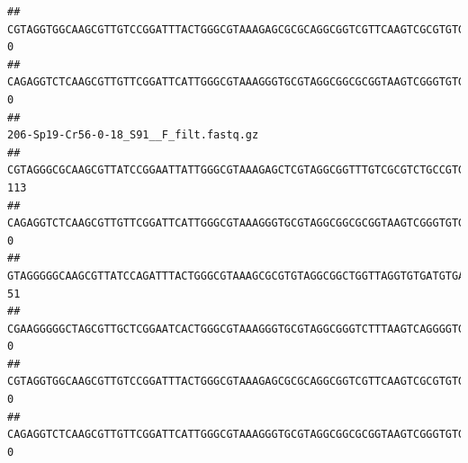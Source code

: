 \documentclass[]{article}
\begin{document}
\begin{verbatim}
## CGTAGGTGGCAAGCGTTGTCCGGATTTACTGGGCGTAAAGAGCGCGCAGGCGGTCGTTCAAGTCGCGTGTGAAAGCCCCCGGCTCAACTGGGGAGGGTCACGCGATACTGATCGACTCGAAGGCAGGAGAGGGTAGTGGAATTCCCGGTGTAGTGGTGAAATGCGTAGATATCGGGAGGAACACCAGTGGCGAAGGCGACTACCTGGCCTGTTCTTGACGCTGAGGCGCGAAAGCTAGGGGAGCAAACG                                       0
## CAGAGGTCTCAAGCGTTGTTCGGATTCATTGGGCGTAAAGGGTGCGTAGGCGGCGCGGTAAGTCGGGTGTGAAATCTCGGGGCTTAACTCCGAAACTGCATTCGATACTGCCGTGCTTGAGGACTGGAGAGGAGACTGGAATTTACGGTGTAGCGGTGAAATGCGTAGATATCGTAAGGAAGACCAGTGGCGAAGGCGGGTCTCTGGACAGTTCCTGACGCTGAGGCACGAAGGCCAGGGGAGCAAACG                                       0
##                                                                                                                                                                                                                                                           206-Sp19-Cr56-0-18_S91__F_filt.fastq.gz
## CGTAGGGCGCAAGCGTTATCCGGAATTATTGGGCGTAAAGAGCTCGTAGGCGGTTTGTCGCGTCTGCCGTGAAAGTCCGGGGCTCAACTCCGGATCTGCGGTGGGTACGGGCAGACTAGAGTGATGTAGGGGAGACTGGAATTCCTGGTGTAGCGGTGAAATGCGCAGATATCAGGAGGAACACCGATGGCGAAGGCAGGTCTCTGGGCATTAACTGACGCTGAGGAGCGAAAGCATGGGGAGCGAACA                                     113
## CAGAGGTCTCAAGCGTTGTTCGGATTCATTGGGCGTAAAGGGTGCGTAGGCGGCGCGGTAAGTCGGGTGTGAAATCTCGGAGCTTAACTCCGAAACTGCATTCGATACTGCCGTGCTTGAGGACTGGAGAGGAGACTGGAATTTACGGTGTAGCGGTGAAATGCGTAGATATCGTAAGGAAGACCAGTGGCGAAGGCGGGTCTCTGGACAGTTCCTGACGCTGAGGCACGAAGGCCAGGGGAGCAAACG                                       0
## GTAGGGGGCAAGCGTTATCCAGATTTACTGGGCGTAAAGCGCGTGTAGGCGGCTGGTTAGGTGTGATGTGAAATCTTCCGGCTCAACCGGAAAACTGCATTGCAAACCGGCCTGGCTAGAGTGCAGGAGAGGGAAGCGGAATTCCAGGTGTAGCGGTGAAATGCGTAGATATCTGGAGGAACACCAGTGGCGAAGGCGGCTTCCTGGCCTGCAACTGACGCTGAGACGCGAAAGCGTGGGGAGCGAAC                                       51
## CGAAGGGGGCTAGCGTTGCTCGGAATCACTGGGCGTAAAGGGTGCGTAGGCGGGTCTTTAAGTCAGGGGTGAAATCCTGGAGCTCAACTCCAGAACTGCCTTTGATACTGAAGATCTTGAGTTCGGGAGAGGTGAGTGGAACTGCGAGTGTAGAGGTGAAATTCGTAGATATTCGCAAGAACACCAGTGGCGAAGGCGGCTCACTGGCCCGATACTGACGCTGAGGCACGAAAGCGTGGGGAGCAAACA                                       0
## CGTAGGTGGCAAGCGTTGTCCGGATTTACTGGGCGTAAAGAGCGCGCAGGCGGTCGTTCAAGTCGCGTGTGAAAGCCCCCGGCTCAACTGGGGAGGGTCACGCGATACTGATCGACTCGAAGGCAGGAGAGGGTAGTGGAATTCCCGGTGTAGTGGTGAAATGCGTAGATATCGGGAGGAACACCAGTGGCGAAGGCGACTACCTGGCCTGTTCTTGACGCTGAGGCGCGAAAGCTAGGGGAGCAAACG                                       0
## CAGAGGTCTCAAGCGTTGTTCGGATTCATTGGGCGTAAAGGGTGCGTAGGCGGCGCGGTAAGTCGGGTGTGAAATCTCGGGGCTTAACTCCGAAACTGCATTCGATACTGCCGTGCTTGAGGACTGGAGAGGAGACTGGAATTTACGGTGTAGCGGTGAAATGCGTAGATATCGTAAGGAAGACCAGTGGCGAAGGCGGGTCTCTGGACAGTTCCTGACGCTGAGGCACGAAGGCCAGGGGAGCAAACG                                       0

\end{verbatim}
\end{document}
